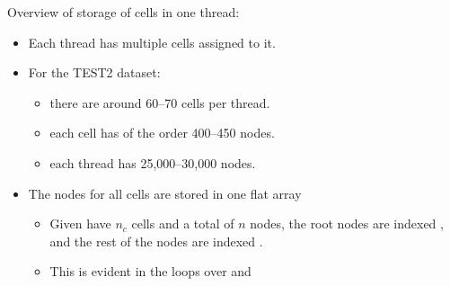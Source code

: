 \noindent
Overview of storage of cells in one thread:
\begin{itemize}
\item
    Each thread has multiple cells assigned to it.
\item
    For the TEST2 dataset:
    \begin{itemize}
    \item
        there are around 60--70 cells per thread.
    \item
        each cell has of the order 400--450 nodes.
    \item
        each thread has 25,000--30,000 nodes.
    \end{itemize}
\item
    The nodes for all cells are stored in one flat array
    \begin{itemize}
    \item
        Given have $n_c$ cells and a total of $n$ nodes, the root nodes are indexed \lst{[1:n_c]}, and the rest of the nodes are indexed \lst{[n_c+1:n]}.
    \item
        This is evident in the loops over  and 
    \end{itemize}
\end{itemize}

